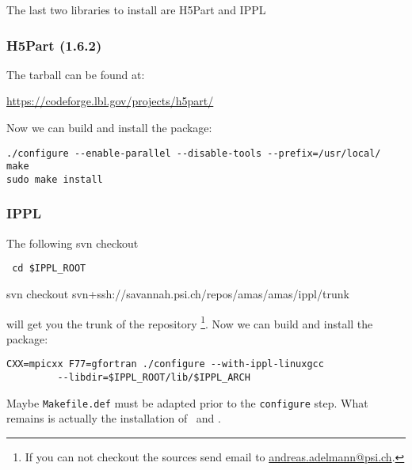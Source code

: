 The last two libraries to install are H5Part  and IPPL
\subsubsection{H5Part (1.6.2)}
The tarball can be found at:
\begin{center}
\url{https://codeforge.lbl.gov/projects/h5part/} 
\end{center}
Now we can build and install the package:
\begin{footnotesize}
\begin{verbatim}
./configure --enable-parallel --disable-tools --prefix=/usr/local/
make 
sudo make install
\end{verbatim}
\end{footnotesize}

\subsubsection{IPPL}
The following svn checkout
\begin{footnotesize}
\begin{verbatim} cd $IPPL_ROOT
\end{verbatim}
\end{footnotesize}
\begin{center}
svn checkout svn+ssh://savannah.psi.ch/repos/amas/amas/ippl/trunk
\end{center}
will get you the trunk of the repository \footnote{If you can not checkout the sources
send email to \url{andreas.adelmann@psi.ch}.}. Now we can build and install the package:
\begin{footnotesize}
\begin{verbatim}
CXX=mpicxx F77=gfortran ./configure --with-ippl-linuxgcc 
         --libdir=$IPPL_ROOT/lib/$IPPL_ARCH
\end{verbatim}
\end{footnotesize}
Maybe {\tt Makefile.def} must be adapted prior to the {\tt configure} step.
What remains is actually the installation of \classic\ and \opal.






